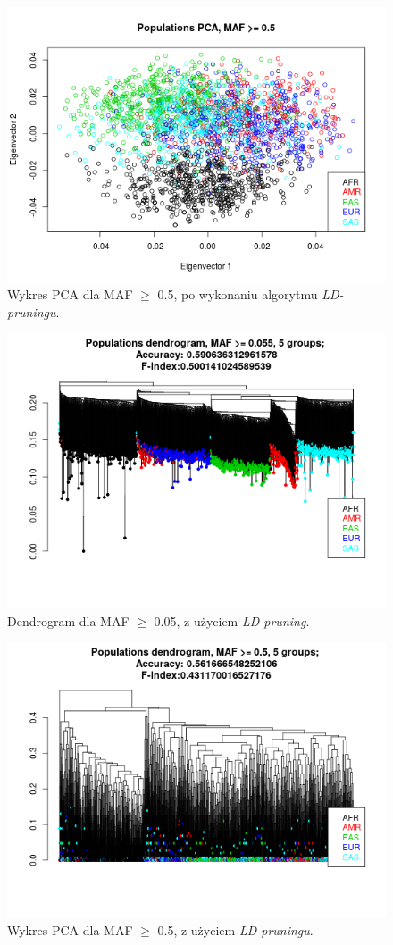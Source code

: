 \documentclass[a4paper]{article}
\begin{document}
\begin{figure}
\centering \includegraphics[width=13cm]{pca-maf-0_5.png}
\caption{Wykres PCA dla MAF $\geq$ 0.5, po wykonaniu algorytmu \emph{LD-pruningu}. } \label{fig:maf05-ld}
\end{figure}

\begin{figure} 
\centering \includegraphics[width=13cm]{dend-maf-0_05-ld.png}
\caption{Dendrogram dla MAF $\geq$ 0.05, z użyciem \emph{LD-pruning}. } \label{fig:dend-005}
\end{figure}

\begin{figure}
\centering \includegraphics[width=13cm]{dend-maf-0_5-ld.png}
\caption{Wykres PCA dla MAF $\geq$ 0.5, z użyciem \emph{LD-pruningu}. } \label{fig:dend-05}
\end{figure}
\end{document}
